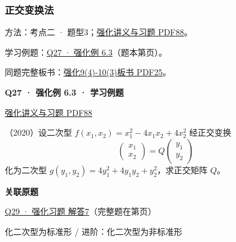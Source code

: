 \documentclass[UTF8,fontset=fandol,11pt,a4paper]{ctexart}
\newcommand{\source}[1]{{\footnotesize\color{Muted}#1\par}}
\newcommand{\qtitle}[2]{\par\needspace{5\baselineskip}\hypertarget{#1}{}\label{#1}\textbf{#2}\par}
\begin{document}
\subsubsection*{正交变换法}
\hypertarget{node-A4O}{}
方法：考点二 · 题型3；\href{file:///Users/skyintelligence/Desktop/\%E5\%BE\%97\%E8\%AF\%BB\%E4\%B8\%AA\%E7\%A0\%94-\%E5\%8C\%97\%E5\%A4\%A7\%E8\%BD\%AF\%E5\%BE\%AE/\%E6\%95\%B0\%E5\%AD\%A6\%20150/Kira\%C2\%B727\%E7\%BA\%BF\%E6\%80\%A7\%E4\%BB\%A3\%E6\%95\%B0\%E5\%BC\%BA\%E5\%8C\%96\%E8\%AE\%B2\%E4\%B9\%89\%2B\%E4\%B9\%A0\%E9\%A2\%98.pdf\#page=88}{强化讲义与习题 PDF88}。\par
学习例题：\hyperlink{R-EX-03}{Q27 · 强化例 6.3}（题本第\pageref*{R-EX-03}页）。\par
同题完整板书：\href{file:///Users/skyintelligence/Desktop/\%E5\%BE\%97\%E8\%AF\%BB\%E4\%B8\%AA\%E7\%A0\%94-\%E5\%8C\%97\%E5\%A4\%A7\%E8\%BD\%AF\%E5\%BE\%AE/\%E6\%95\%B0\%E5\%AD\%A6\%20150/\%E7\%BA\%BF\%E6\%80\%A7\%E4\%BB\%A3\%E6\%95\%B0/\%E7\%BA\%BF\%E4\%BB\%A3\%E5\%BC\%BA\%E5\%8C\%969\%284\%29-10\%283\%29\%20\%20\%E7\%AC\%AC\%E4\%BA\%94\%E5\%85\%AD\%E7\%AB\%A0\%20\%E5\%AE\%9E\%E5\%AF\%B9\%E7\%A7\%B0\%E7\%9F\%A9\%E9\%98\%B5\%26\%E4\%BA\%8C\%E6\%AC\%A1\%E5\%9E\%8B1\%E3\%80\%90\%E4\%BE\%8B5.6\%E3\%80\%91-\%E3\%80\%90\%E4\%BE\%8B6.4\%E3\%80\%91.pdf\#page=25}{强化9(4)-10(3)板书 PDF25}。\par
\vspace{3mm}
\begin{minipage}{\linewidth}
\qtitle{R-EX-03}{Q27 · 强化例 6.3 · 学习例题}
\source{\href{file:///Users/skyintelligence/Desktop/\%E5\%BE\%97\%E8\%AF\%BB\%E4\%B8\%AA\%E7\%A0\%94-\%E5\%8C\%97\%E5\%A4\%A7\%E8\%BD\%AF\%E5\%BE\%AE/\%E6\%95\%B0\%E5\%AD\%A6\%20150/Kira\%C2\%B727\%E7\%BA\%BF\%E6\%80\%A7\%E4\%BB\%A3\%E6\%95\%B0\%E5\%BC\%BA\%E5\%8C\%96\%E8\%AE\%B2\%E4\%B9\%89\%2B\%E4\%B9\%A0\%E9\%A2\%98.pdf\#page=88}{强化讲义与习题 PDF88}}
（2020）设二次型 $f(x_1,x_2)=x_1^2-4x_1x_2+4x_2^2$ 经正交变换
\[\begin{pmatrix}x_1\\x_2\end{pmatrix}=Q\begin{pmatrix}y_1\\y_2\end{pmatrix}\]
化为二次型 $g(y_1,y_2)=4y_1^2+4y_1y_2+y_2^2$，求正交矩阵 $Q$。
\end{minipage}\par\vspace{7mm}
\textbf{关联原题}\par
\hyperlink{R-LONG-07}{Q29 · 强化习题 解答7}（完整题在第\pageref*{R-LONG-07}页）\par
\clearpage
\source{化二次型为标准形 / 进阶：化二次型为非标准形}
\end{document}
